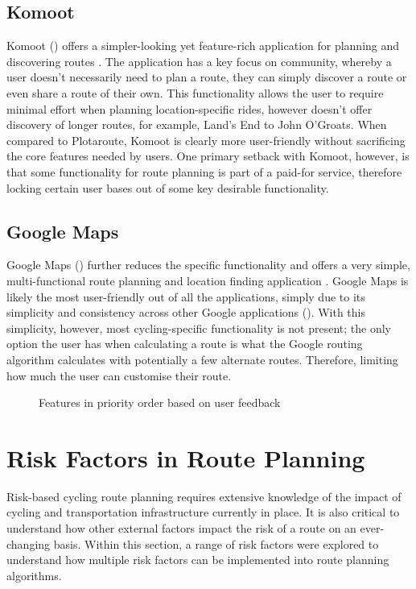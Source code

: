 \subsection{Komoot}
\label{litrev:komoot}
Komoot (\cite{noauthor_komoot_nodate}) offers a simpler-looking yet feature-rich application for planning and discovering routes . The application has a key focus on community, whereby a user doesn't necessarily need to plan a route, they can simply discover a route or even share a route of their own. This functionality allows the user to require minimal effort when planning location-specific rides, however doesn't offer discovery of longer routes, for example, Land's End to John O'Groats. When compared to Plotaroute, Komoot is clearly more user-friendly without sacrificing the core features needed by users. One primary setback with Komoot, however, is that some functionality for route planning is part of a paid-for service, therefore locking certain user bases out of some key desirable functionality.

\subsection{Google Maps}
\label{litrev:gmaps}

Google Maps (\cite{noauthor_google_nodate}) further reduces the specific functionality and offers a very simple, multi-functional route planning and location finding application . Google Maps is likely the most user-friendly out of all the applications, simply due to its simplicity and consistency across other Google applications (\cite{noauthor_material_nodate}). With this simplicity, however, most cycling-specific functionality is not present; the only option the user has when calculating a route is what the Google routing algorithm calculates with potentially a few alternate routes. Therefore, limiting how much the user can customise their route.

\begin{figure}[h!]
    \centering
    \caption{Features in priority order based on user feedback}
    \label{fig:features}
\end{figure}

\section{Risk Factors in Route Planning}
Risk-based cycling route planning requires extensive knowledge of the impact of cycling and transportation infrastructure currently in place. It is also critical to understand how other external factors impact the risk of a route on an ever-changing basis. Within this section, a range of risk factors were explored to understand how multiple risk factors can be implemented into route planning algorithms.

